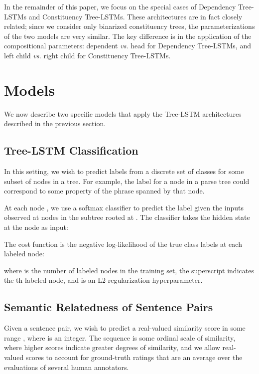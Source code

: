 \documentclass[11pt]{article}
\begin{document}
\medskip
In the remainder of this paper, we focus on the special cases of Dependency Tree-LSTMs and Constituency Tree-LSTMs. These architectures are in fact closely related; since we consider only binarized constituency trees, the parameterizations of the two models are very similar. The key difference is in the application of the compositional parameters: dependent \emph{vs.} head for Dependency Tree-LSTMs, and left child \emph{vs.} right child for Constituency Tree-LSTMs.

\section{Models}

We now describe two specific models that apply the Tree-LSTM architectures described in the previous section.

\subsection{Tree-LSTM Classification}
\label{sec:classification-model}

In this setting, we wish to predict labels  from a discrete set of classes  for some subset of nodes in a tree. For example, the label for a node in a parse tree could correspond to some property of the phrase spanned by that node.

At each node , we use a softmax classifier to predict the label  given the inputs  observed at nodes in the subtree rooted at . The classifier takes the hidden state  at the node as input: 


The cost function is the negative log-likelihood of the true class labels  at each labeled node:

where  is the number of labeled nodes in the training set, the superscript  indicates the th labeled node, and  is an L2 regularization hyperparameter.

\subsection{Semantic Relatedness of Sentence Pairs}
\label{sec:sim-model}

Given a sentence pair, we wish to predict a real-valued similarity score in some range , where  is an integer. The sequence  is some ordinal scale of similarity, where higher scores indicate greater degrees of similarity, and we allow real-valued scores to account for ground-truth ratings that are an average over the evaluations of several human annotators.
\end{document}

